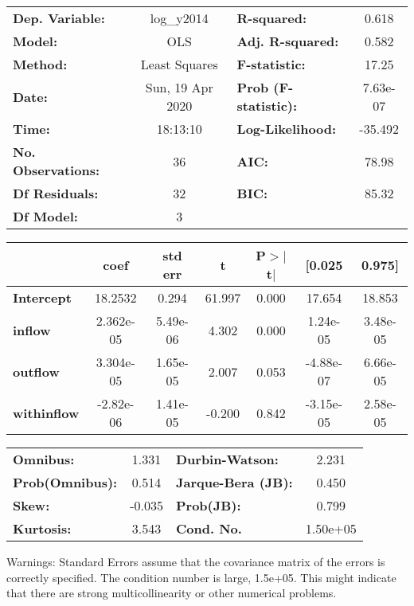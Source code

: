 \begin{center}
\begin{tabular}{lclc}
\toprule
\textbf{Dep. Variable:}    &    log\_y2014    & \textbf{  R-squared:         } &     0.618   \\
\textbf{Model:}            &       OLS        & \textbf{  Adj. R-squared:    } &     0.582   \\
\textbf{Method:}           &  Least Squares   & \textbf{  F-statistic:       } &     17.25   \\
\textbf{Date:}             & Sun, 19 Apr 2020 & \textbf{  Prob (F-statistic):} &  7.63e-07   \\
\textbf{Time:}             &     18:13:10     & \textbf{  Log-Likelihood:    } &   -35.492   \\
\textbf{No. Observations:} &          36      & \textbf{  AIC:               } &     78.98   \\
\textbf{Df Residuals:}     &          32      & \textbf{  BIC:               } &     85.32   \\
\textbf{Df Model:}         &           3      & \textbf{                     } &             \\
\bottomrule
\end{tabular}
\begin{tabular}{lcccccc}
                    & \textbf{coef} & \textbf{std err} & \textbf{t} & \textbf{P$> |$t$|$} & \textbf{[0.025} & \textbf{0.975]}  \\
\midrule
\textbf{Intercept}  &      18.2532  &        0.294     &    61.997  &         0.000        &       17.654    &       18.853     \\
\textbf{inflow}     &    2.362e-05  &     5.49e-06     &     4.302  &         0.000        &     1.24e-05    &     3.48e-05     \\
\textbf{outflow}    &    3.304e-05  &     1.65e-05     &     2.007  &         0.053        &    -4.88e-07    &     6.66e-05     \\
\textbf{withinflow} &    -2.82e-06  &     1.41e-05     &    -0.200  &         0.842        &    -3.15e-05    &     2.58e-05     \\
\bottomrule
\end{tabular}
\begin{tabular}{lclc}
\textbf{Omnibus:}       &  1.331 & \textbf{  Durbin-Watson:     } &    2.231  \\
\textbf{Prob(Omnibus):} &  0.514 & \textbf{  Jarque-Bera (JB):  } &    0.450  \\
\textbf{Skew:}          & -0.035 & \textbf{  Prob(JB):          } &    0.799  \\
\textbf{Kurtosis:}      &  3.543 & \textbf{  Cond. No.          } & 1.50e+05  \\
\bottomrule
\end{tabular}
\end{center}

Warnings: \newline
 [1] Standard Errors assume that the covariance matrix of the errors is correctly specified. \newline
 [2] The condition number is large, 1.5e+05. This might indicate that there are \newline
 strong multicollinearity or other numerical problems.